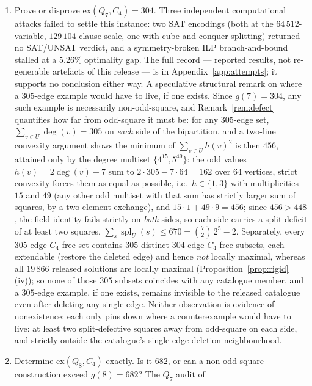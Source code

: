 \documentclass[12pt,a4paper]{article}
\theoremstyle{definition}
\newcommand{\ex}{\mathrm{ex}}
\begin{document}
\begin{enumerate}
  \item\label{op:q7exact} Prove or disprove $\ex(Q_7,C_4)=304$.
    Three independent computational attacks failed to settle this
    instance: two SAT encodings (both at the $64\,512$-variable,
    $129\,104$-clause scale, one with cube-and-conquer splitting) returned
    no SAT/UNSAT verdict, and a symmetry-broken ILP branch-and-bound
    stalled at a $5.26\%$ optimality gap. The full record --- reported
    results, not re-generable artefacts of this release --- is in
    Appendix~\ref{app:attempts}; it supports no conclusion either way.
        A speculative structural remark on where a $305$-edge example would
    have to live, if one exists. Since $g(7)=304$, any such example is
    necessarily non-odd-square, and Remark~\ref{rem:defect} quantifies
    how far from odd-square it must be: for any $305$-edge set,
    $\sum_{v\in U}\deg(v)=305$ on \emph{each} side of the bipartition,
    and a two-line convexity argument shows the minimum of
    $\sum_{v\in U}h(v)^2$ is then $456$, attained only by the degree
    multiset $\{4^{15},5^{49}\}$: the odd values $h(v)=2\deg(v)-7$ sum
    to $2\cdot305-7\cdot64=162$ over $64$ vertices, strict convexity
    forces them as equal as possible, i.e.\ $h\in\{1,3\}$ with
    multiplicities $15$ and $49$ (any other odd multiset with that sum
    has strictly larger sum of squares, by a two-element exchange), and
    $15\cdot1+49\cdot9=456$; since $456>448$,
    the field identity fails strictly on \emph{both} sides, so each side
    carries a split deficit of at least two squares,
    $\sum_s\operatorname{spl}_U(s)\le670=\binom72\,2^{5}-2$.
    Separately, every $305$-edge $C_4$-free set contains $305$ distinct
    $304$-edge $C_4$-free subsets, each extendable (restore the deleted
    edge) and hence \emph{not} locally maximal, whereas all $19\,866$
    released solutions are locally maximal
    (Proposition~\ref{prop:rigid}(iv)); so none of those $305$ subsets
    coincides with any catalogue member, and a $305$-edge example, if one
    exists, remains invisible to the released catalogue even after
    deleting any single edge. Neither observation is evidence of
    nonexistence; each only pins down where a counterexample would have
    to live: at least two split-defective squares away from odd-square on
    each side, and strictly outside the catalogue's single-edge-deletion
    neighbourhood.
  \item\label{op:q8exact} Determine $\ex(Q_8,C_4)$ exactly. Is it $682$, or can a
    non-odd-square construction exceed $g(8)=682$? The $Q_7$ audit of

\end{enumerate}
\end{document}
